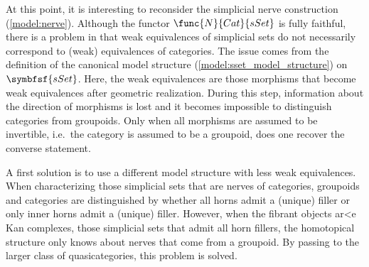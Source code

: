     At this point, it is interesting to reconsider the simplicial nerve construction (\cref{model:nerve}). Although the functor $\func{N}{Cat}{sSet}$ is fully faithful, there is a problem in that weak equivalences of simplicial sets do not necessarily correspond to (weak) equivalences of categories. The issue comes from the definition of the canonical model structure (\cref{model:sset_model_structure}) on $\symbfsf{sSet}$. Here, the weak equivalences are those morphisms that become weak equivalences after geometric realization. During this step, information about the direction of morphisms is lost and it becomes impossible to distinguish categories from groupoids. Only when all morphisms are assumed to be invertible, i.e.~the category is assumed to be a groupoid, does one recover the converse statement.

    A first solution is to use a different model structure with less weak equivalences.
    When characterizing those simplicial sets that are nerves of categories, groupoids and categories are distinguished by whether all horns admit a (unique) filler or only inner horns admit a (unique) filler. However, when the fibrant objects ar<e Kan complexes, those simplicial sets that admit all horn fillers, the homotopical structure only knows about nerves that come from a groupoid. By passing to the larger class of quasicategories, this problem is solved.

